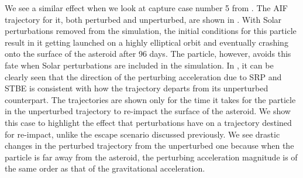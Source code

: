 We see a similar effect when we look at capture case number 5 from . The \gls{AIF} trajectory for it, both perturbed and unperturbed, are shown in . With Solar perturbations removed from the simulation, the initial conditions for this particle result in it getting launched on a highly elliptical orbit and eventually crashing onto the surface of the asteroid after 96 days. The particle, however, avoids this fate when Solar perturbations are included in the simulation. In , it can be clearly seen that the direction of the perturbing acceleration due to \gls{SRP} and \gls{STBE} is consistent with how the trajectory departs from its unperturbed counterpart. The trajectories are shown only for the time it takes for the particle in the unperturbed trajectory to re-impact the surface of the asteroid. We show this case to highlight the effect that perturbations have on a trajectory destined for re-impact, unlike the escape scenario discussed previously. We see drastic changes in the perturbed trajectory from the unperturbed one because when the particle is far away from the asteroid, the perturbing acceleration magnitude is of the same order as that of the gravitational acceleration.
